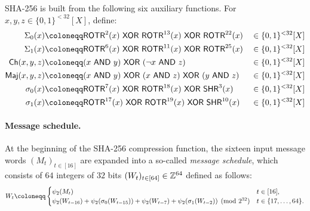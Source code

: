 \documentclass[11pt,letterpaper,usenames,dvipsnames]{article}
\begin{document}
SHA-256 is built from the following six auxiliary functions.
For $x,y,z\in\{0,1\}^{<32}[X]$, define:
\begin{equation}\label{eq:sha256_auxiliary_functions}
\begin{aligned}
\Sigma_0(x) &\coloneqq \ROTR^2(x)\xor\ROTR^{13}(x)\xor\ROTR^{22}(x) &&\in\{0,1\}^{<32}[X]\\
\Sigma_1(x)&\coloneqq \ROTR^6(x)\xor\ROTR^{11}(x)\xor\ROTR^{25}(x)&&\in\{0,1\}^{<32}[X]\\
\Ch(x,y,z) &\coloneqq (x\band y)\xor(\Not x\band z)&&\in\{0,1\}^{<32}[X]\\
\Maj(x,y,z)&\coloneqq (x\band y)\xor(x\band z)\xor(y\band z)&&\in\{0,1\}^{<32}[X]\\
\sigma_0(x) &\coloneqq \ROTR^7(x)\xor\ROTR^{18}(x)\xor\SHR^3(x)&&\in\{0,1\}^{<32}[X]\\
\sigma_1(x)&\coloneqq \ROTR^{17}(x)\xor\ROTR^{19}(x)\xor\SHR^{10}(x)&&\in\{0,1\}^{<32}[X]
\end{aligned}
\end{equation}

\paragraph{Message schedule.}
At the beginning of the SHA-256 compression function, the sixteen input message words $(M_t)_{t\in[16]}$ are expanded into a so-called \emph{message schedule}, which consists of $64$ integers of $32$ bits $(W_t)_{t\in[64]}\in\mathbb{Z}^{64}$ defined as follows:
\begin{equation}\label{eq:sha256_message_schedule_def}
W_t \coloneqq 
\begin{cases}
\psi_2(M_t) & t\in[16],\\
\psi_2(W_{t-16})+\psi_2(\sigma_0(W_{t-15}))+\psi_2(W_{t-7})+\psi_2(\sigma_1(W_{t-2})) \pmod{2^\wordsize} & t\in\{17,\dots,64\}.
\end{cases}
\end{equation}
\end{document}
